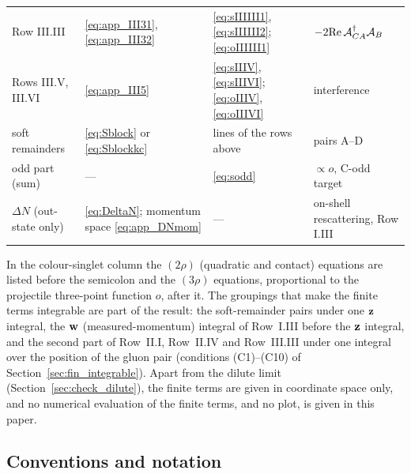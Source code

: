 \begin{center}
\begin{tabular}{@{}>{\raggedright\arraybackslash}p{}>{\raggedright\arraybackslash}p{}>{\raggedright\arraybackslash}p{}>{\raggedright\arraybackslash}p{}@{}}
Row III.III & \eqref{eq:app_III31}, \eqref{eq:app_III32} & \eqref{eq:sIIIIII1}, \eqref{eq:sIIIIII2}; \eqref{eq:oIIIIII1} & $-2{\rm Re}\,\mathcal A_{CA}^\dagger\mathcal A_B$\\
Rows III.V, III.VI & \eqref{eq:app_III5} & \eqref{eq:sIIIV}, \eqref{eq:sIIIVI}; \eqref{eq:oIIIV}, \eqref{eq:oIIIVI} & interference\\
soft remainders & \eqref{eq:Sblock} or \eqref{eq:Sblockkc} & lines of the rows above & pairs A--D\\
odd part (sum) & --- & \eqref{eq:sodd} & $\propto o$, C-odd target\\
\midrule
$\Delta N$ (out-state only) & \eqref{eq:DeltaN}; momentum space \eqref{eq:app_DNmom} & --- & on-shell rescattering, Row I.III\\
\bottomrule
\end{tabular}
\end{center}
In the colour-singlet column the $(2\rho)$ (quadratic and contact) equations are listed before the semicolon and the $(3\rho)$ equations, proportional to the projectile three-point function $o$, after it. The groupings that make the finite terms integrable are part of the result: the soft-remainder pairs under one $\mathbf{z}$ integral, the $\mathbf{w}$ (measured-momentum) integral of Row~I.III before the $\mathbf{z}$ integral, and the second part of Row~II.I, Row~II.IV and Row~III.III under one integral over the position of the gluon pair (conditions (C1)--(C10) of Section~\ref{sec:fin_integrable}). Apart from the dilute limit (Section~\ref{sec:check_dilute}), the finite terms are given in coordinate space only, and no numerical evaluation of the finite terms, and no plot, is given in this paper.

\subsection{Conventions and notation}\label{sec:fin_conv}

